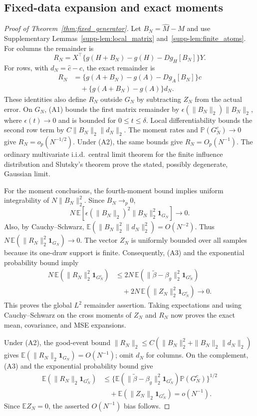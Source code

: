 \documentclass[pdflatex,iicol,sn-mathphys-ay]{sn-jnl}
\theoremstyle{thmstyleone}
\theoremstyle{thmstylethree}
\theoremstyle{thmstyletwo}
\newcommand{\E}{\mathbb E}
\newcommand{\Prob}{\mathbb P}
\begin{document}
\subsection{Fixed-data expansion and exact moments}
\label{app:proof-fixed-generator}

\begin{proof}[Proof of Theorem~{\upshape\ref{thm:fixed_generator}}]
Let $B_N=\widehat M-M$ and use Supplementary Lemmas~\ref{supp-lem:local_matrix}
and~\ref{supp-lem:finite_atoms}. For columns the remainder is
\[
 R_N=X^\top\{g(H+B_N)-g(H)-Dg_H[B_N]\}Y.
\]
For rows, with $d_N=\widehat c-c$, the exact remainder is
\[
 \begin{aligned}
 R_N&=\{g(A+B_N)-g(A)-Dg_A[B_N]\}c\\
    &\quad +\{g(A+B_N)-g(A)\}d_N.
 \end{aligned}
\]
These identities also define $R_N$ outside $G_N$ by subtracting $Z_N$
from the actual error. On $G_N$, (A1) bounds the first matrix remainder
by $\epsilon(\|B_N\|_2)\|B_N\|_2$, where $\epsilon(t)\to0$ and is bounded
for $0\le t\le\delta$. Local differentiability bounds the second row term
by $C\|B_N\|_2\|d_N\|_2$.
The moment rates and $\Prob(G_N^c)\to0$ give $R_N=o_p(N^{-1/2})$.
Under (A2), the same bounds give $R_N=O_p(N^{-1})$.
The ordinary multivariate i.i.d.\ central limit theorem for the finite
influence distribution and Slutsky's theorem prove the stated, possibly
degenerate, Gaussian limit.

For the moment conclusions, the fourth-moment bound implies uniform
integrability of $N\|B_N\|_2^2$. Since $B_N\to_p0$,
\[
 N\,\E[\epsilon(\|B_N\|_2)^2\|B_N\|_2^2 \mathbf{1}_{G_N}]\longrightarrow0.
\]
Also, by Cauchy--Schwarz,
$\E(\|B_N\|_2^2\|d_N\|_2^2)=O(N^{-2})$.
Thus $N\,\E(\|R_N\|_2^2 \mathbf{1}_{G_N})\to0$.
The vector $Z_N$ is uniformly bounded over all samples because its
one-draw support is finite. Consequently, (A3) and the exponential
probability bound imply
\[
 \begin{aligned}
 N\,\E(\|R_N\|_2^2 \mathbf{1}_{G_N^c})
 &\le 2N\,\E(\|\widetilde\beta-\beta_g\|_2^2 \mathbf{1}_{G_N^c})\\
 &\quad +2N\,\E(\|Z_N\|_2^2 \mathbf{1}_{G_N^c})\longrightarrow0.
 \end{aligned}
\]
This proves the global $L^2$ remainder assertion.
Taking expectations and using Cauchy--Schwarz on the cross moments of
$Z_N$ and $R_N$ now proves the exact mean, covariance, and MSE expansions.

Under (A2), the good-event bound
$\|R_N\|_2\le C(\|B_N\|_2^2+\|B_N\|_2\|d_N\|_2)$
gives $\E(\|R_N\|_2 \mathbf{1}_{G_N})=O(N^{-1})$; omit $d_N$ for columns.
On the complement, (A3) and the exponential probability bound give
\[
 \begin{aligned}
 \E(\|R_N\|_2 \mathbf{1}_{G_N^c})
 &\le \{\E(\|\widetilde\beta-\beta_g\|_2^2 \mathbf{1}_{G_N^c})
                \Prob(G_N^c)\}^{1/2}\\
 &\quad +\E(\|Z_N\|_2 \mathbf{1}_{G_N^c})=o(N^{-1}).
 \end{aligned}
\]
Since $\E Z_N=0$, the asserted $O(N^{-1})$ bias follows.
\end{proof}
\end{document}
